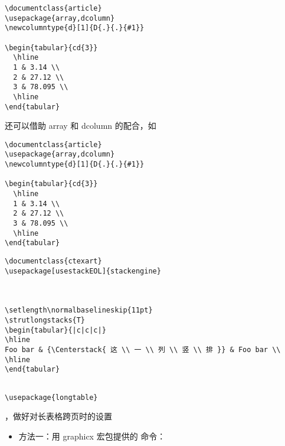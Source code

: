 \begin{verbatim}
\documentclass{article}
\usepackage{array,dcolumn}
\newcolumntype{d}[1]{D{.}{.}{#1}}

\begin{tabular}{cd{3}}
  \hline
  1 & 3.14 \\
  2 & 27.12 \\
  3 & 78.095 \\
  \hline
\end{tabular}

\end{verbatim}


还可以借助 array 和 dcolumn 的配合，如

\begin{verbatim}
\documentclass{article}
\usepackage{array,dcolumn}
\newcolumntype{d}[1]{D{.}{.}{#1}}

\begin{tabular}{cd{3}}
  \hline
  1 & 3.14 \\
  2 & 27.12 \\
  3 & 78.095 \\
  \hline
\end{tabular}

\end{verbatim}



\begin{verbatim}
\documentclass{ctexart}
\usepackage[usestackEOL]{stackengine}



\setlength\normalbaselineskip{11pt}
\strutlongstacks{T}
\begin{tabular}{|c|c|c|}
\hline
Foo bar & {\Centerstack{ 这 \\ 一 \\ 列 \\ 竖 \\ 排 }} & Foo bar \\
\hline
\end{tabular}


\end{verbatim}



\begin{verbatim}
\usepackage{longtable}
\end{verbatim}

，做好对长表格跨页时的设置



\begin{itemize}

\item
  方法一：用 graphicx 宏包提供的  命令：
\end{itemize}

